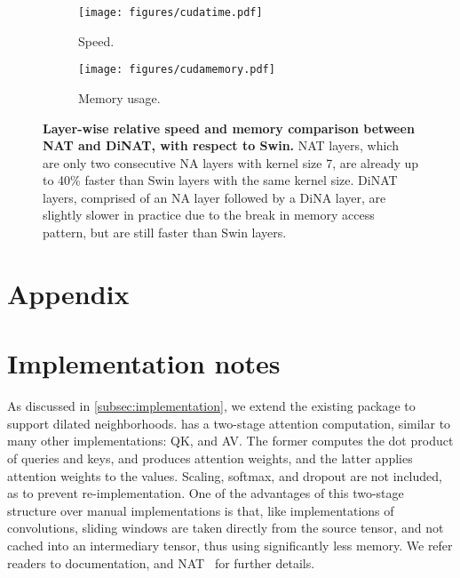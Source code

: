 \appendix
\renewcommand{\thetable}{\Roman{table}}
\renewcommand{\thefigure}{\Roman{figure}}
\setcounter{table}{0}
\setcounter{figure}{0}

\begin{figure*}[t]
    \centering
    \begin{subfigure}{0.4\textwidth}
        \centering
        \texttt{[image: figures/cudatime.pdf]}
        \caption{Speed.}
        \label{appfig:cudatime}
    \end{subfigure}
    \hfill
    \begin{subfigure}{0.595\textwidth}
        \centering
        \texttt{[image: figures/cudamemory.pdf]}
        \caption{Memory usage.}
        \label{appfig:cudamemory}
    \end{subfigure}
    \caption{
    \textbf{Layer-wise relative speed and memory comparison between NAT and DiNAT, with respect to Swin.} 
    NAT layers, which are only two consecutive NA layers with kernel size 7\sq{}, are already up to 40\% faster than Swin layers with the same kernel size.
    DiNAT layers, comprised of an NA layer followed by a DiNA layer, are slightly slower in practice due to the break in memory access pattern, but are still faster than Swin layers.
    }
    \label{appfig:cudatimeandmemory}
\end{figure*}

\section*{\Large{Appendix}}


\section{Implementation notes}
\label{appsec:implementation}

As discussed in \cref{subsec:implementation}, we extend the existing \natten{} package to support dilated neighborhoods.
\natten{} has a two-stage attention computation, similar to many other implementations: QK, and AV. The former computes the dot product of queries and keys, and produces attention weights, and the latter applies attention weights to the values. Scaling, softmax, and dropout are not included, as to prevent re-implementation.
One of the advantages of this two-stage structure over manual implementations is that, like implementations of convolutions, sliding windows are taken directly from the source tensor, and not cached into an intermediary tensor, thus using significantly less memory. We refer readers to \natten{} documentation, and NAT~\cite{hassani2022neighborhood} for further details.

